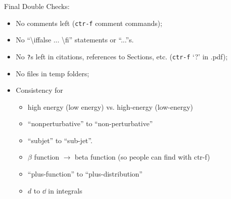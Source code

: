 \begin{sambox}{Final Double Checks:}
\begin{itemize}
    \item
    No comments left (\texttt{ctr-f} comment commands);
    
    \item
    No ``\textbackslash iffalse ... \textbackslash fi'' statements or ``...''s.
    
    \item 
    No \texttt{?}s left in citations, references to Sections, etc. (\texttt{ctr-f} `?' in .pdf);
    
    \item
    No files in temp folders;
    
    \item
    Consistency for
    \begin{itemize}
	\item
	high energy (low energy) vs. high-energy (low-energy)
	
	\item
	``nonperturbative'' to ``non-perturbative''

	\item 
	``subjet'' to ``sub-jet''.
	
	\item
	\(\beta\) function \(\to\) beta function (so people can find with ctr-f)
	
	\item
	``plus-function'' to ``plus-distribution''
	
	\item \(d\) to \(\dd\) in integrals
    \end{itemize}
\end{itemize}
\end{sambox}